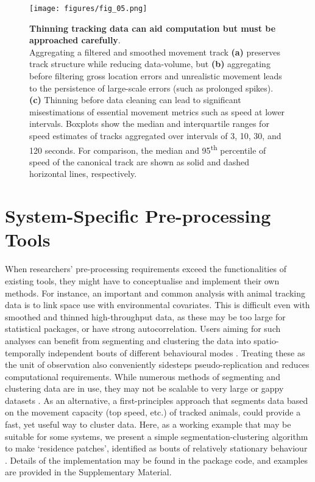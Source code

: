 \begin{refsection}[sorting=nyt]
    \begin{figure}[h!]
        \centering
        \texttt{[image: figures/fig\_05.png]}
        \caption{
            \textbf{Thinning tracking data can aid computation but must be approached carefully}.\\
            Aggregating a filtered and smoothed movement track \textbf{(a)} preserves track structure while reducing data-volume, but \textbf{(b)} aggregating before filtering gross location errors and unrealistic movement leads to the persistence of large-scale errors (such as prolonged spikes).
            \textbf{(c)} Thinning before data cleaning can lead to significant misestimations of essential movement metrics such as speed at lower intervals.
            Boxplots show the median and interquartile ranges for speed estimates of tracks aggregated over intervals of 3, 10, 30, and 120 seconds.
            For comparison, the median and 95\textsuperscript{th} percentile of speed of the canonical track are shown as solid and dashed horizontal lines, respectively.
        }
        \label{fig:figure_thinning}
    \end{figure}

    \section*{System-Specific Pre-processing Tools}

    When researchers' pre-processing requirements exceed the functionalities of existing tools, they might have to conceptualise and implement their own methods.
    For instance, an important and common analysis with animal tracking data is to link space use with environmental covariates.
    This is difficult even with smoothed and thinned high-throughput data, as these may be too large for statistical packages, or have strong autocorrelation.
    Users aiming for such analyses can benefit from segmenting and clustering the data into spatio-temporally independent bouts of different behavioural modes \citep{patin2020a}.
    Treating these as the unit of observation also conveniently sidesteps pseudo-replication and reduces computational requirements.
    While numerous methods of segmenting and clustering data are in use, they may not be scalable to very large or gappy datasets \citep{patin2020a, langrock2012, michelot2016}.
    As an alternative, a first-principles approach that segments data based on the movement capacity (top speed, etc.) of tracked animals, could provide a fast, yet useful way to cluster data.
    Here, as a working example that may be suitable for some systems, we present a simple segmentation-clustering algorithm to make `residence patches', identified as bouts of relatively stationary behaviour \citep[][]{barraquand2008,bijleveld2016,oudman2018}.
    Details of the implementation may be found in the package code, and examples are provided in the Supplementary Material.


\end{refsection}
